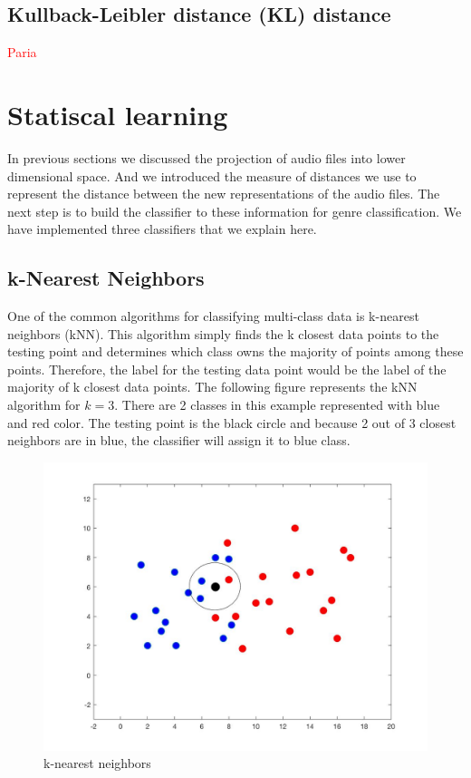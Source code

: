 \documentclass[12pt]{article}
\begin{document}
\subsection{Kullback-Leibler distance (KL) distance}\textcolor{red}{Paria}

	\section{Statiscal learning}
	In previous sections we discussed the projection of audio files into lower dimensional space. And we introduced the measure of distances we use to represent the distance between the new representations of the audio files. The next step is to build the classifier to these information for genre classification. We have implemented three classifiers that we explain here. 
	\subsection{k-Nearest Neighbors}
	One of the common algorithms for classifying multi-class data is k-nearest neighbors (kNN). This algorithm simply finds the k closest data points to the testing point and determines which class owns the majority of points among these points. Therefore, the label for the testing data point would be the label of the majority of k closest data points.
	The following figure represents the kNN algorithm for $k = 3$. There are 2 classes in this example represented with blue and red color. The testing point is the black circle and because 2 out of 3 closest neighbors are in blue, the classifier will assign it to blue class.
	\begin{figure}[H]\label{kNN}
		\centering
		\includegraphics[width=.8\linewidth]{kNN.jpg}
		\caption{k-nearest neighbors}
	\end{figure}
\end{document}
